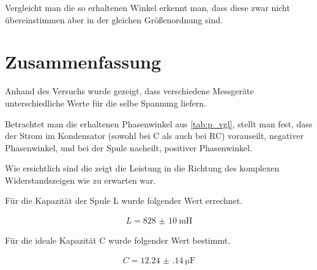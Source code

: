 \documentclass[11pt,ngerman]{scrartcl}
\begin{document}

Vergleicht man die so erhaltenen Winkel erkennt man, dass diese zwar nicht
übereinstimmen aber in der gleichen Größenordnung sind.

\section{Zusammenfassung}

Anhand des Versuchs wurde gezeigt, dass verschiedene Messgeräte
unterschiedliche Werte für die selbe Spannung liefern.

\vspace{2mm}

Betrachtet man die erhaltenen Phasenwinkel aus \autoref{tab:p_vgl}, stellt man
fest, dass der Strom im Kondensator (sowohl bei C als auch bei RC) vorauseilt,
negativer Phasenwinkel, und bei der Spule nacheilt, positiver Phasenwinkel.

\vspace{2mm}

Wie ersichtlich sind die zeigt die Leistung in die Richtung des komplexen
Widerstandszeigen wie zu erwarten war.

\vspace{2mm}

Für die Kapazität der Spule L wurde folgender Wert errechnet.

\begin{align*}
	L = \SI{828(10)}{\milli\henry}
\end{align*}

Für die ideale Kapazität C wurde folgender Wert bestimmt.

\begin{align*}
	C = \SI{12.24(14)}{\micro\farad}
\end{align*}


\newpage

\printbibliography
\listoffigures
\listoftables
\end{document}
